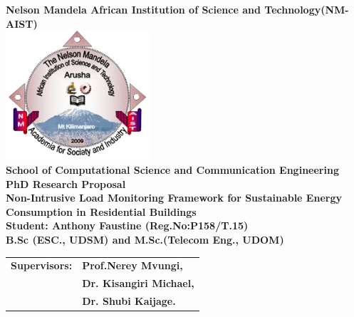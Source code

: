 \begin{titlepage}
     \centering
        \vspace*{0.5cm}
        
       {\Large \textbf{Nelson Mandela African Institution of Science and Technology(NM-AIST)}} \\[1.5 cm]
        
        \includegraphics[width=0.4\textwidth]{images/logo} \\[1.5 cm]
        
        {\large \textbf {School of Computational Science and Communication Engineering}} \\[0.5 cm]
        
       {\large \textbf {PhD Research Proposal}} \\[1.0 cm]
       
   {\Large \textbf{Non-Intrusive Load Monitoring Framework for Sustainable Energy Consumption in Residential  Buildings} } \\[1.0 cm]

	

   { \normalsize \textbf{Student: Anthony Faustine (Reg.No:P158/T.15) }} \\[0.5cm]
            {\normalsize \textbf{ B.Sc (ESC., UDSM) and M.Sc.(Telecom Eng., UDOM) }} \\[0.5cm]
 
 \begin{tabular}{l l}
  {\normalsize \textbf{Supervisors:} } &{\normalsize \textbf{Prof.Nerey Mvungi,}} \\
   &{\normalsize \textbf{Dr. Kisangiri Michael,}} \\
   &{\normalsize \textbf{Dr. Shubi Kaijage.}}

\end{tabular}


   
							 
    \vfill
    
\end{titlepage}